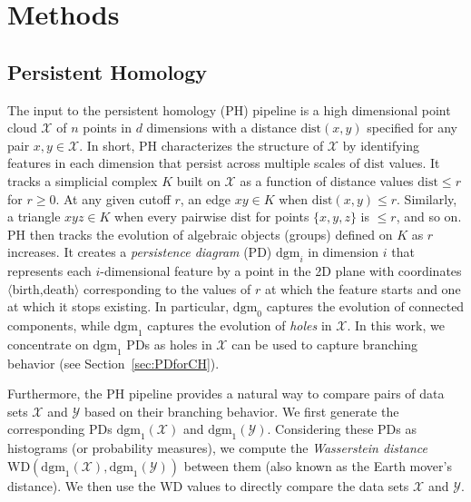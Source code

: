 \section{Methods}
\label{sec:methods}



\subsection{Persistent Homology}
\label{sec:persistence}

The input to the persistent homology (PH) pipeline \cite{edelsbrunner_persistent_2013} is a high dimensional point cloud $\mathcal{X}$ of $n$ points in $d$ dimensions with a distance $\mathrm{dist}(x,y)$ specified for any pair $x,y \in \mathcal{X}$.
In short, PH characterizes the structure of $\mathcal{X}$ by identifying features in each dimension that persist across multiple scales of $\mathrm{dist}$ values.
It tracks a simplicial complex $K$ built on $\mathcal{X}$ as a function of distance values $\mathrm{dist} \leq r$ for $r \geq 0$.
At any given cutoff $r$, an edge $xy \in K$ when $\mathrm{dist}(x,y) \leq r$.
Similarly, a triangle $xyz \in K$ when every pairwise $\mathrm{dist}$ for points $\{x,y,z\}$ is $\leq r$, and so on.
PH then tracks the evolution of algebraic objects (groups) defined on $K$ as $r$ increases.
It creates a \emph{persistence diagram} (PD) $\mathrm{dgm}_i$ in dimension $i$ that represents each $i$-dimensional feature by a point in the 2D plane with coordinates $\langle$birth,death$\rangle$ corresponding to the values of $r$ at which the feature starts and one at which it stops existing.
In particular, $\mathrm{dgm}_0$ captures the evolution of connected components, while $\mathrm{dgm}_1$ captures the evolution of \emph{holes} in $\mathcal{X}$.
In this work, we concentrate on $\mathrm{dgm}_1$ PDs as holes in $\mathcal{X}$ can be used to capture branching behavior (see Section~\ref{sec:PDforCH}).  

Furthermore, the PH pipeline provides a natural way to compare pairs of data sets $\mathcal{X}$ and $\mathcal{Y}$ based on their branching behavior. 
We first generate the corresponding PDs $\mathrm{dgm}_1(\mathcal{X})$ and $\mathrm{dgm}_1(\mathcal{Y})$.
Considering these PDs as histograms (or probability measures), we compute the \emph{Wasserstein distance} $\mathrm{WD}(\mathrm{dgm}_1(\mathcal{X}), \mathrm{dgm}_1(\mathcal{Y}))$ between them (also known as the Earth mover's distance).
We then use the WD values to directly compare the data sets $\mathcal{X}$ and $\mathcal{Y}$.

